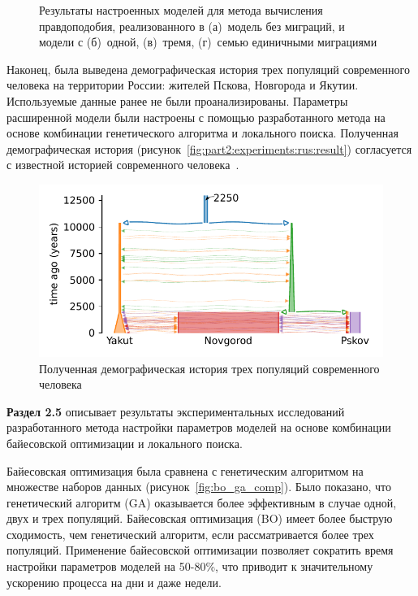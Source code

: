 \begin{figure}[ht]
\begin{subfigure}[b]{0.24\linewidth}
        \caption{}
    \end{subfigure}
    \caption{Результаты настроенных моделей для метода вычисления правдоподобия, реализованного в \momi (а)~модель без миграций, и модели с (б)~одной, (в)~тремя, (г)~семью единичными миграциями}
\end{figure}

Наконец, была выведена демографическая история трех популяций современного человека на территории России: жителей Пскова, Новгорода и Якутии.
Используемые данные ранее не были проанализированы.
Параметры расширенной модели были настроены с помощью разработанного метода на основе комбинации генетического алгоритма и локального поиска.
Полученная демографическая история (рисунок~\ref{fig:part2:experiments:rus:result}) согласуется с известной историей современного человека~\cite{schraiber2015methods, nielsen2017tracing}.

\begin{figure}[hb]
    \centering
        \includegraphics[width=0.7\linewidth]{images_experiments/rus_genomes/picture_result.pdf}
    \caption{Полученная демографическая история трех популяций современного человека}
\end{figure}

\textbf{Раздел 2.5} описывает результаты экспериментальных исследований разработанного метода настройки параметров моделей на основе комбинации байесовской оптимизации и локального поиска.

Байесовская оптимизация была сравнена с генетическим алгоритмом  на множестве наборов данных (рисунок~\ref{fig:bo_ga_comp}).
Было показано, что генетический алгоритм (GA) оказывается более эффективным в случае одной, двух и трех популяций.
Байесовская оптимизация (BO) имеет более быструю сходимость, чем генетический алгоритм, если рассматривается более трех популяций.
Применение байесовской оптимизации позволяет сократить время настройки параметров моделей на 50-80\%, что приводит к значительному ускорению процесса на дни и даже недели.

